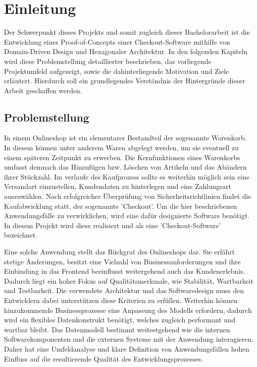 

\chapter{Einleitung}

Der Schwerpunkt dieses Projekts und somit zugleich dieser Bachelorarbeit ist die Entwicklung eines Proof-of-Concepts einer Checkout-Software mithilfe von Domain-Driven Design und Hexagonaler Architektur. In den folgenden Kapiteln wird diese Problemstellung detaillierter beschrieben, das vorliegende Projektumfeld aufgezeigt, sowie die dahinterliegende Motivation und Ziele erläutert. Hierdurch soll ein grundlegendes Verständnis der Hintergründe dieser Arbeit geschaffen werden.

\section{Problemstellung}

In einem Onlineshop ist ein elementarer Bestandteil der sogenannte Warenkorb. In diesem können unter anderem Waren abgelegt werden, um sie eventuell zu einem späteren Zeitpunkt zu erwerben. Die Kernfunktionen eines Warenkorbs umfasst demnach das Hinzufügen bzw. Löschen von Artikeln und das Abändern ihrer Stückzahl. Im verlaufe des Kaufprozess sollte es weiterhin möglich sein eine Versandart einzustellen, Kundendaten zu hinterlegen und eine Zahlungsart auszuwählen. Nach erfolgreicher Überprüfung von Sicherheitsrichtlinien findet die Kaufabwicklung statt, der sogenannte 'Checkout'. Um die hier beschriebenen Anwendungsfälle zu verwirklichen, wird eine dafür designierte Software benötigt. In diesem Projekt wird diese realisiert und als eine 'Checkout-Software' bezeichnet.

Eine solche Anwendung stellt das Rückgrat des Onlineshops dar. Sie erfährt stetige Änderungen, besitzt eine Vielzahl von Businessanforderungen und ihre Einbindung in das Frontend beeinflusst weitergehend auch das Kundenerlebnis. Dadurch liegt ein hoher Fokus auf Qualitätsmerkmale, wie Stabilität, Wartbarkeit und Testbarkeit. Die verwendete Architektur und das Softwaredesign muss den Entwicklern dabei unterstützen diese Kriterien zu erfüllen. Weiterhin können hinzukommende Businessprozesse eine Anpassung des Modells erfordern, dadurch wird ein flexibles Datenkonstrukt benötigt, welches zugleich performant und wartbar bleibt. Das Datenmodell bestimmt weitestgehend wie die internen Softwarekomponenten und die externen Systeme mit der Anwendung interagieren. Daher hat eine Umfeldanalyse und klare Definition von Anwendungsfällen hohen Einfluss auf die resultierende Qualität des Entwicklungsprozesses.

